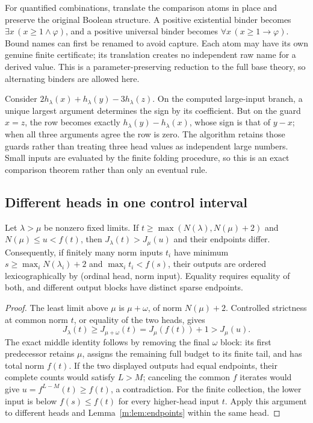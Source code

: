 For quantified combinations, translate the comparison atoms in place and
preserve the original Boolean structure.  A positive existential binder
becomes $\exists x\,(x\ge1\wedge\varphi)$, and a positive universal
binder becomes $\forall x\,(x\ge1\mathbin{\to}\varphi)$.  Bound names
can first be renamed to avoid capture.  Each atom may have its own
genuine finite certificate; its translation creates no independent raw
name for a derived value.  This is a parameter-preserving reduction to
the full base theory, so alternating binders are allowed here.

\begin{example}
Consider $2h_\lambda(x)+h_\lambda(y)-3h_\lambda(z)$. On the computed
large-input branch, a unique largest argument determines the sign by its
coefficient. But on the guard $x=z$, the row becomes exactly
$h_\lambda(y)-h_\lambda(x)$, whose sign is that of $y-x$; when all three
arguments agree the row is zero. The algorithm retains those guards rather
than treating three head values as independent large numbers. Small inputs
are evaluated by the finite folding procedure, so this is an exact
comparison theorem rather than only an eventual rule.
\end{example}

\subsection{Different heads in one control interval}
\begin{lemma}\label{m:lem:head-window}
Let $\lambda>\mu$ be nonzero fixed limits. If
$t\ge\max(N(\lambda),N(\mu)+2)$ and
$N(\mu)\le u<f(t)$, then $J_\lambda(t)>J_\mu(u)$ and their endpoints
differ. Consequently, if finitely many norm inputs $t_i$ have minimum
$s\ge\max_iN(\lambda_i)+2$ and $\max_i t_i<f(s)$, their outputs are
ordered lexicographically by (ordinal head, norm input). Equality requires
equality of both, and different output blocks have distinct sparse endpoints.
\end{lemma}
\begin{proof}
The least limit above $\mu$ is $\mu+\omega$, of norm $N(\mu)+2$.
Controlled strictness at common norm $t$, or equality of the two heads,
gives
\[
 J_\lambda(t)\ge J_{\mu+\omega}(t)
       =J_\mu(f(t))+1>J_\mu(u).
\]
The exact middle identity follows by removing the final $\omega$ block:
its first predecessor retains $\mu$, assigns the remaining full budget
to its finite tail, and has total norm $f(t)$. If the two displayed
outputs had equal endpoints, their complete counts would satisfy
$L>M$; canceling the common $f$ iterates would give
$u=f^{L-M}(t)\ge f(t)$, a contradiction. For the finite collection, the
lower input is below $f(s)\le f(t)$ for every higher-head input $t$.
Apply this argument to different heads and
Lemma~\ref{m:lem:endpoints} within the same head.
\end{proof}

